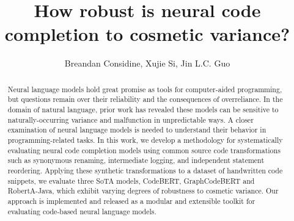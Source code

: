 \documentclass[sigconf,review,anonymous]{acmart}
\begin{document}
  \title{How robust is neural code completion to cosmetic variance?}


  \author{Breandan Considine, Xujie Si, Jin L.C. Guo}


  \begin{abstract}
    Neural language models hold great promise as tools for computer-aided programming, but questions remain over their reliability and the consequences of overreliance. In the domain of natural language, prior work has revealed these models can be sensitive to naturally-occurring variance and malfunction in unpredictable ways. A closer examination of neural language models is needed to understand their behavior in programming-related tasks. In this work, we develop a methodology for systematically evaluating neural code completion models using common source code transformations such as synonymous renaming, intermediate logging, and independent statement reordering. Applying these synthetic transformations to a dataset of handwritten code snippets, we evaluate three SoTA models, CodeBERT, GraphCodeBERT and RobertA-Java, which exhibit varying degrees of robustness to cosmetic variance. Our approach is implemented and released as a modular and extensible toolkit for evaluating code-based neural language models.


  \end{abstract}
\end{document}
